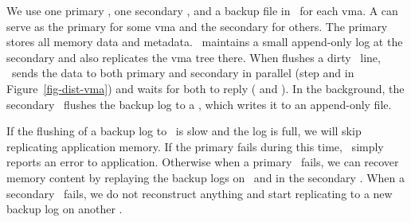 We use one primary \mcomponent, one secondary \mcomponent, and a backup file in \scomponent\ for each vma.
A \mcomponent{} can serve as the primary for some vma and the secondary for others.
The primary stores all memory data and metadata.
\lego\ maintains a small append-only log at the secondary \mcomponent{}
and also replicates the vma tree there.
When \pcomponent{} flushes a dirty \excache\ line, 
\lego\ sends the data to both primary and secondary in parallel (step  and  in Figure~\ref{fig-dist-vma})
and waits for both to reply ( and ).
In the background, the secondary \mcomponent\ flushes the backup log to a \scomponent{},
which writes it to an append-only file.

If the flushing of a backup log to \scomponent\ is slow and the log is full, 
we will skip replicating application memory.
If the primary fails during this time, \lego\ simply reports an error to application.
Otherwise when a primary \mcomponent\ fails, we can recover memory content 
by replaying the backup logs on \scomponent\ and in the secondary \mcomponent.
When a secondary \mcomponent\ fails, we do not reconstruct anything 
and start replicating to a new backup log on another \mcomponent{}.

